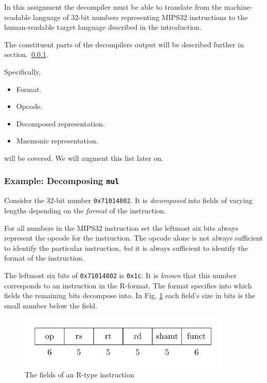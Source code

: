 \documentclass[a4paper]{article}
\begin{document}
In this assignment the decompiler must be able to translate from the
machine-readable language of 32-bit numbers representing MIPS32
instructions to the human-readable target language described in the
introduction.

The constituent parts of the decompilers output will
be described further in section.~\ref{section:mul-example}.

Specifically,

\begin{itemize}
  \item Format.
  \item Opcode.
  \item Decomposed representation.
  \item Mnemonic representation.
\end{itemize}

will be covered. We will augment this list later on.
\subsubsection{Example: Decomposing \texttt{mul}}\label{section:mul-example}

Consider the 32-bit number \texttt{0x71014802}. It is
\emph{decomposed} into fields of varying lengths depending on the
\emph{format} of the instruction.

For all numbers in the MIPS32 instruction set the leftmost six bits
always represent the opcode for the instruction. The opcode alone is
not always sufficient to identify the particular instruction,
\emph{but} it is always sufficient to identify the format of the
instruction.

The leftmost six bits of \texttt{0x71014802} is \texttt{0x1c}. It is
\emph{known} that this number corresponds to an instruction in the
R-format. The format specifies into which fields the remaining bits
decompose into. In Fig. \ref{fig:r-decomposed} each field's size in
bits is the small number below the field.

\begin{figure}[H]
  \centering
  \includegraphics[width=0.9\textwidth]{figures/r-decomposed.png}
  \caption{The fields of an R-type instruction}
  \label{fig:r-decomposed}
\end{figure}
\end{document}
